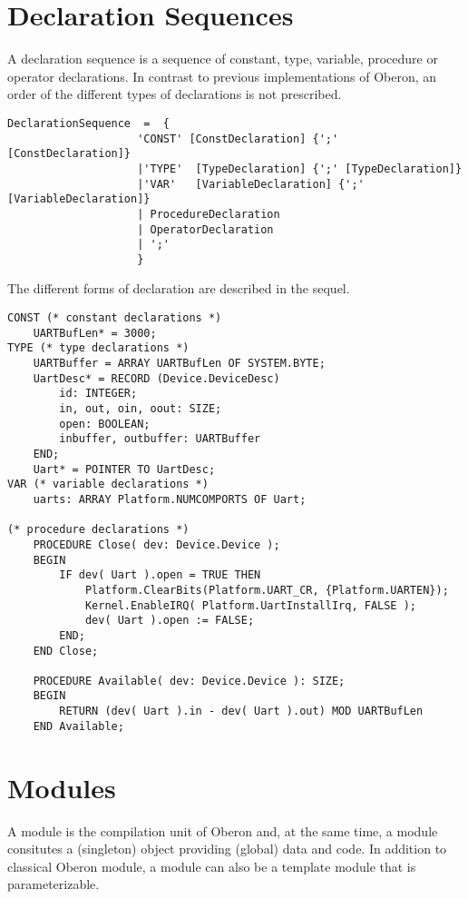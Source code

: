 \documentclass[a4wide,11pt]{article}
\begin{document}
\section{Declaration Sequences}

A declaration sequence is a sequence of constant, type, variable, procedure or operator declarations.
In contrast to previous implementations of Oberon, an order of the different types of declarations is not prescribed.

\begin{lstlisting}[style=ebnf]
DeclarationSequence  =  {
					'CONST' [ConstDeclaration] {';' [ConstDeclaration]}
					|'TYPE'  [TypeDeclaration] {';' [TypeDeclaration]}
					|'VAR'   [VariableDeclaration] {';' [VariableDeclaration]}
					| ProcedureDeclaration
					| OperatorDeclaration
					| ';'
					}
\end{lstlisting}

The different forms of declaration are described in the sequel.

\begin{annotation}

\begin{lstlisting}[style=example,caption=Example of a declaration sequence]
CONST (* constant declarations *)
	UARTBufLen* = 3000;
TYPE (* type declarations *)
	UARTBuffer = ARRAY UARTBufLen OF SYSTEM.BYTE;
	UartDesc* = RECORD (Device.DeviceDesc)
		id: INTEGER;
		in, out, oin, oout: SIZE;
		open: BOOLEAN;
		inbuffer, outbuffer: UARTBuffer
	END;
	Uart* = POINTER TO UartDesc;
VAR (* variable declarations *)
	uarts: ARRAY Platform.NUMCOMPORTS OF Uart;

(* procedure declarations *)
	PROCEDURE Close( dev: Device.Device );
	BEGIN
		IF dev( Uart ).open = TRUE THEN
			Platform.ClearBits(Platform.UART_CR, {Platform.UARTEN});
			Kernel.EnableIRQ( Platform.UartInstallIrq, FALSE );
			dev( Uart ).open := FALSE;
		END;
	END Close;

	PROCEDURE Available( dev: Device.Device ): SIZE;
	BEGIN
		RETURN (dev( Uart ).in - dev( Uart ).out) MOD UARTBufLen
	END Available;
\end{lstlisting}
\end{annotation}

\section{Modules}
A module is the compilation unit of Oberon and, at the same time, a module consitutes a (singleton) object providing (global) data and code.
In addition to classical Oberon module, a module can also be a template module that is parameterizable.
\end{document}
